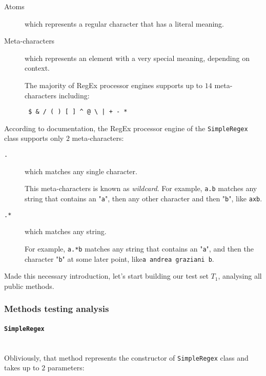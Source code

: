 \documentclass[sigconf]{acmart}
\begin{document}
\begin{description}
\item[Atoms] which represents a regular character that has a literal meaning. 
\item[Meta-characters] which represents an element with a very special meaning, depending on context. 

The majority of RegEx processor engines supports up to $14$ meta-characters including: \begin{verbatim} $ & / ( ) [ ] ^ @ \ | + - *  \end{verbatim} 
\end{description}

According to documentation, the RegEx processor engine of the \texttt{SimpleRegex} class supports only $2$ meta-characters:

\begin{description}
\item[\texttt{.}] which matches any single character.

This meta-characters is known as \textit{wildcard}. For example, \colorbox{beaublue}{\texttt{a.b}} matches any string that contains an "\texttt{a}", then any other character and then "\texttt{b}", like \colorbox{beaublue}{\texttt{axb}}.

\item[\texttt{.*}] which matches any string. 

For example, \colorbox{beaublue}{\texttt{a.*b}} matches any string that contains an "\texttt{a}", and then the character "\texttt{b}" at some later point, like\newline  \colorbox{beaublue}{\texttt{a andrea graziani b}}.
\end{description}

Made this necessary introduction, let's start building our test set $T_1$, analysing all public methods.

\subsubsection{Methods testing analysis}

\paragraph{\texttt{SimpleRegex}}
\hfill\\
Obliviously, that method represents the constructor of \texttt{SimpleRegex} class and takes up to $2$ parameters:
\end{document}
